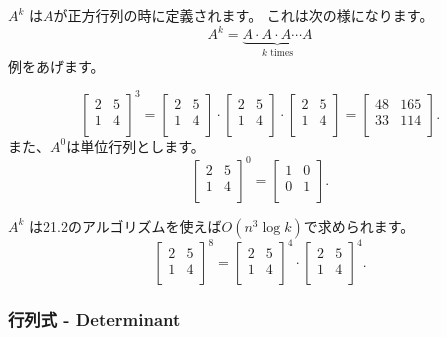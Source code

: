 $A^k$ は$A$が正方行列の時に定義されます。
これは次の様になります。
\[ A^k = \underbrace{A \cdot A \cdot A \cdots A}_{\textrm{$k$ times}} \]
例をあげます。

\[
 \begin{bmatrix}
  2 & 5 \\
  1 & 4 \\
 \end{bmatrix}^3 =
 \begin{bmatrix}
  2 & 5 \\
  1 & 4 \\
 \end{bmatrix} \cdot
 \begin{bmatrix}
  2 & 5 \\
  1 & 4 \\
 \end{bmatrix} \cdot
 \begin{bmatrix}
  2 & 5 \\
  1 & 4 \\
 \end{bmatrix} =
 \begin{bmatrix}
  48 & 165 \\
  33 & 114 \\
 \end{bmatrix}.
\]
また、$A^0$は単位行列とします。
\[
 \begin{bmatrix}
  2 & 5 \\
  1 & 4 \\
 \end{bmatrix}^0 =
 \begin{bmatrix}
  1 & 0 \\
  0 & 1 \\
 \end{bmatrix}.
\]

$A^k$ は21.2のアルゴリズムを使えば$O(n^3 \log k)$で求められます。
\[
 \begin{bmatrix}
  2 & 5 \\
  1 & 4 \\
 \end{bmatrix}^8 =
 \begin{bmatrix}
  2 & 5 \\
  1 & 4 \\
 \end{bmatrix}^4 \cdot
 \begin{bmatrix}
  2 & 5 \\
  1 & 4 \\
 \end{bmatrix}^4.
\]

\subsubsection{行列式 - Determinant}

